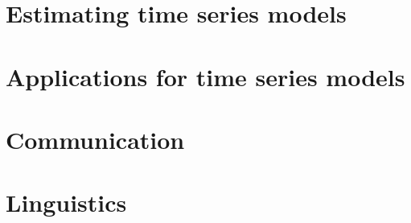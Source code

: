 \documentclass[oneside]{book}
\begin{document}
\part{Estimating time series models}










\part{Applications for time series models}







\part{Communication}






\part{Linguistics}



\end{document}
